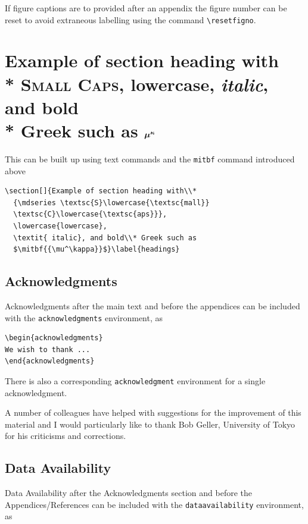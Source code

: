 \documentclass{gji}
\begin{document}
If figure captions are to provided after an appendix the figure number can
be reset to avoid extraneous labelling using the command
\verb"\resetfigno".

\section[]{Example of section heading with\\*
  {\mdseries \textsc{S}\lowercase{\textsc{mall}}
  \textsc{C}\lowercase{\textsc{aps}}},
  \lowercase{lowercase},
  \textit{ italic}, and bold\\* Greek such as
  $\mitbf{{\mu^\kappa}}$}\label{headings}

This can be built up using text commands and the \verb"mitbf"
command introduced above

\begin{verbatim}
\section[]{Example of section heading with\\*
  {\mdseries \textsc{S}\lowercase{\textsc{mall}}
  \textsc{C}\lowercase{\textsc{aps}}},
  \lowercase{lowercase},
  \textit{ italic}, and bold\\* Greek such as
  $\mitbf{{\mu^\kappa}}$}\label{headings}
\end{verbatim}

\subsection{Acknowledgments}
Acknowledgments after the main text and before the appendices can be
included with the
\texttt{acknowledgments} environment, as
\begin{verbatim}
\begin{acknowledgments}
We wish to thank ...
\end{acknowledgments}
\end{verbatim}
There is also a corresponding \texttt{acknowledgment} environment for a
single acknowledgment.

\begin{acknowledgments}
A number of colleagues have helped with suggestions for the
improvement of this material and I would particularly like to thank
Bob Geller, University of Tokyo for his criticisms and corrections.
\end{acknowledgments}

\subsection{Data Availability}
Data Availability after the Acknowledgments section and before the Appendices/References can be
included with the \texttt{dataavailability} environment, as
\end{document}
